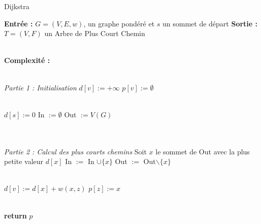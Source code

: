 \documentclass{article}      %
\begin{document}
\begin{algorithm} \caption{Dijkstra}
\begin{algorithmic}

\State \textbf{Entrée :} $G = (V, E, w)$, un graphe pondéré et $s$ un sommet de départ
\State \textbf{Sortie :} $T = (V, F)$ un Arbre de Plus Court Chemin

\\ \State \textbf{Complexité :} %

\\ \State \textit{Partie 1 : Initialisation}
    \State $d[v] := +\infty$
    \State $p[v] := \emptyset$
\EndFor

\\ \State $d[s] := 0$
\State In $:= \emptyset$
\State Out $:= V(G)$

\\\\ \State \textit{Partie 2 : Calcul des plus courts chemins}
    \State Soit $x$ le sommet de Out avec la plus petite valeur $d[x]$
    \State In $:=$ In $\cup \{x\}$
    \State Out $:=$ Out$\backslash \{x\}$
    
    \\ 
            \State $d[v] := d[x] + w(x, z)$
            \State $p[z] := x$
        \EndIf
    \EndFor
\EndWhile

\\ \State \textbf{return} $p$
\end{algorithmic}
\end{algorithm}
\end{document}
